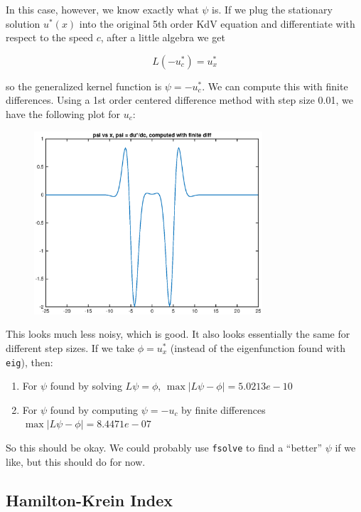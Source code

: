 \documentclass[12pt]{article}
\begin{document}
In this case, however, we know exactly what $\psi$ is. If we plug the stationary solution $u^*(x)$ into the original 5th order KdV equation and differentiate with respect to the speed $c$, after a little algebra we get

\begin{equation}
L(-u^*_c) = u^*_x
\end{equation}

so the generalized kernel function is $\psi = -u^*_c$. We can compute this with finite differences. Using a 1st order centered difference method with step size 0.01, we have the following plot for $u_c$:

\begin{figure}[H]
	\includegraphics[width=8.5cm]{fdpsi.eps}
\end{figure}

This looks much less noisy, which is good. It also looks essentially the same for different step sizes. If we take $\phi = u^*_x$ (instead of the eigenfunction found with \texttt{eig}), then:

\begin{enumerate}
	\item For $\psi$ found by solving $L \psi = \phi$, $\max{|L \psi - \phi|} = 5.0213e-10$ 
	\item For $\psi$ found by computing $\psi = -u_c$ by finite differences $\max{|L \psi - \phi|} = 8.4471e-07$
\end{enumerate}

So this should be okay. We could probably use \texttt{fsolve} to find a ``better'' $\psi$ if we like, but this should do for now. 

\subsection{Hamilton-Krein Index}
\end{document}
